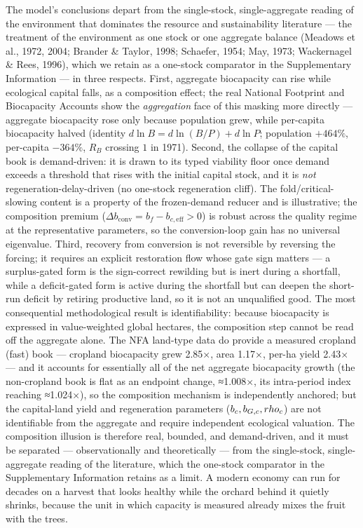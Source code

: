 \documentclass[11pt]{article}
\begin{document}
The model's conclusions depart from the single-stock, single-aggregate reading of the environment that dominates the resource and sustainability literature --- the treatment of the environment as one stock or one aggregate balance (Meadows et al., 1972, 2004; Brander \& Taylor, 1998; Schaefer, 1954; May, 1973; Wackernagel \& Rees, 1996), which we retain as a one-stock comparator in the Supplementary Information --- in three respects. First, aggregate biocapacity can rise while ecological capital falls, as a composition effect; the real National Footprint and Biocapacity Accounts show the \emph{aggregation} face of this masking more directly --- aggregate biocapacity rose only because population grew, while per-capita biocapacity halved (identity $d\ln B=d\ln(B/P)+d\ln P$; population $+464\%$, per-capita $-364\%$, $R_B$ crossing $1$ in 1971). Second, the collapse of the capital book is demand-driven: it is drawn to its typed viability floor once demand exceeds a threshold that rises with the initial capital stock, and it is \emph{not} regeneration-delay-driven (no one-stock regeneration cliff). The fold/critical-slowing content is a property of the frozen-demand reducer and is illustrative; the composition premium ($\Delta b_{\mathrm{conv}}=b_f-b_{c,\mathrm{eff}}>0$) is robust across the quality regime at the representative parameters, so the conversion-loop gain has no universal eigenvalue. Third, recovery from conversion is not reversible by reversing the forcing; it requires an explicit restoration flow whose gate sign matters --- a surplus-gated form is the sign-correct rewilding but is inert during a shortfall, while a deficit-gated form is active during the shortfall but can deepen the short-run deficit by retiring productive land, so it is not an unqualified good. The most consequential methodological result is identifiability: because biocapacity is expressed in value-weighted global hectares, the composition step cannot be read off the aggregate alone. The NFA land-type data do provide a measured cropland (fast) book --- cropland biocapacity grew 2.85×, area 1.17×, per-ha yield 2.43× --- and it accounts for essentially all of the net aggregate biocapacity growth (the non-cropland book is flat as an endpoint change, ≈1.008×, its intra-period index reaching ≈1.024×), so the composition mechanism is independently anchored; but the capital-land yield and regeneration parameters ($b_c,\\ b_{G,c},\\ \\rho_c$) are not identifiable from the aggregate and require independent ecological valuation. The composition illusion is therefore real, bounded, and demand-driven, and it must be separated --- observationally and theoretically --- from the single-stock, single-aggregate reading of the literature, which the one-stock comparator in the Supplementary Information retains as a limit. A modern economy can run for decades on a harvest that looks healthy while the orchard behind it quietly shrinks, because the unit in which capacity is measured already mixes the fruit with the trees.
\end{document}
